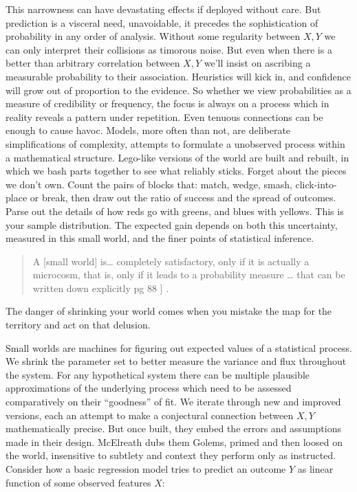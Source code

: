 \documentclass[
]{book}
\theoremstyle{definition}
\theoremstyle{definition}
\theoremstyle{definition}
\theoremstyle{remark}
\begin{document}
This narrowness can have devastating effects if deployed without care. But prediction is a visceral need, unavoidable, it precedes the sophistication of probability in any order of analysis. Without some regularity between \(X, Y\) we can only interpret their collisions as timorous noise. But even when there is a better than arbitrary correlation between \(X, Y\) we'll insist on ascribing a measurable probability to their association. Heuristics will kick in, and confidence will grow out of proportion to the evidence. So whether we view probabilities as a measure of credibility or frequency, the focus is always on a process which in reality reveals a pattern under repetition. Even tenuous connections can be enough to cause havoc. Models, more often than not, are deliberate simplifications of complexity, attempts to formulate a unobserved process within a mathematical structure. Lego-like versions of the world are built and rebuilt, in which we bash parts together to see what reliably sticks. Forget about the pieces we don't own. Count the pairs of blocks that: match, wedge, smash, click-into-place or break, then draw out the ratio of success and the spread of outcomes. Parse out the details of how reds go with greens, and blues with yellows. This is your sample distribution. The expected gain depends on both this uncertainty, measured in this small world, and the finer points of statistical inference.

\begin{quote}
A {[}small world{]} is\ldots{} completely satisfactory, only if it is actually a microcosm, that is, only if it leads to a probability measure \ldots{} that can be written down explicitly pg 88 \citep{savage54}{]} .
\end{quote}

The danger of shrinking your world comes when you mistake the map for the territory and act on that delusion.

Small worlds are machines for figuring out expected values of a statistical process. We shrink the parameter set to better measure the variance and flux throughout the system. For any hypothetical system there can be multiple plausible approximations of the underlying process which need to be assessed comparatively on their ``goodness'' of fit. We iterate through new and improved versions, each an attempt to make a conjectural connection between \(X, Y\) mathematically precise. But once built, they embed the errors and assumptions made in their design. McElreath dubs them Golems, primed and then loosed on the world, insensitive to subtlety and context they perform only as instructed. Consider how a basic regression model tries to predict an outcome \(Y\) as linear function of some observed features \(X\):
\end{document}
